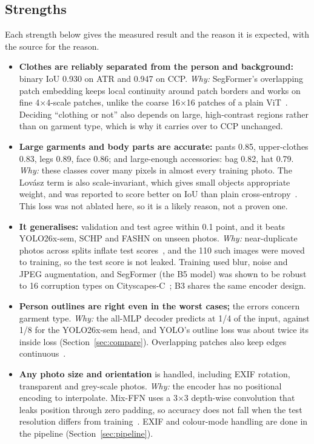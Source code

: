 \documentclass[conference,a4paper]{IEEEtran}
\begin{document}
\subsection{Strengths}
\label{sec:strengths}
Each strength below gives the measured result and the reason it is expected, with the source for the reason.
\begin{itemize}
  \item \textbf{Clothes are reliably separated from the person and background:} binary IoU 0.930 on ATR and 0.947 on CCP. \emph{Why:} SegFormer's overlapping patch embedding keeps local continuity around patch borders and works on fine 4$\times$4-scale patches, unlike the coarse 16$\times$16 patches of a plain ViT~\cite{segformer,vitsurvey}. Deciding ``clothing or not'' also depends on large, high-contrast regions rather than on garment type, which is why it carries over to CCP unchanged.
  \item \textbf{Large garments and body parts are accurate:} pants 0.85, upper-clothes 0.83, legs 0.89, face 0.86; and large-enough accessories: bag 0.82, hat 0.79. \emph{Why:} these classes cover many pixels in almost every training photo. The Lov\'asz term is also scale-invariant, which gives small objects appropriate weight, and was reported to score better on IoU than plain cross-entropy~\cite{lovasz}. This loss was not ablated here, so it is a likely reason, not a proven one.
  \item \textbf{It generalises:} validation and test agree within 0.1 point, and it beats YOLO26x-sem, SCHP and FASHN on unseen photos. \emph{Why:} near-duplicate photos across splits inflate test scores~\cite{barz}, and the 110 such images were moved to training, so the test score is not leaked. Training used blur, noise and JPEG augmentation, and SegFormer (the B5 model) was shown to be robust to 16 corruption types on Cityscapes-C~\cite{segformer}; B3 shares the same encoder design.
  \item \textbf{Person outlines are right even in the worst cases;} the errors concern garment type. \emph{Why:} the all-MLP decoder predicts at 1/4 of the input, against 1/8 for the YOLO26x-sem head, and YOLO's outline loss was about twice its inside loss (Section~\ref{sec:compare}). Overlapping patches also keep edges continuous~\cite{segformer}.
  \item \textbf{Any photo size and orientation} is handled, including EXIF rotation, transparent and grey-scale photos. \emph{Why:} the encoder has no positional encoding to interpolate. Mix-FFN uses a 3$\times$3 depth-wise convolution that leaks position through zero padding, so accuracy does not fall when the test resolution differs from training~\cite{segformer,vitsurvey}. EXIF and colour-mode handling are done in the pipeline (Section~\ref{sec:pipeline}).

\end{itemize}
\end{document}
